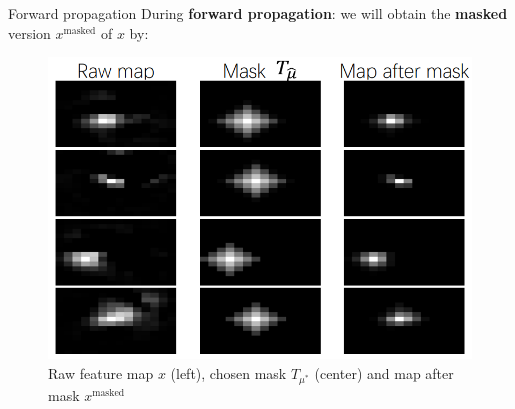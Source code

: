 \documentclass{beamer}
\begin{document}
\begin{frame}{Forward propagation}
	During \textbf{forward propagation}: we will obtain the \textbf{masked} version $x^{\mathrm{masked}}$ of $x$ by:
    \begin{figure}
        \centering
        \includegraphics[width=0.65\linewidth]{figures/masks.png}
        \caption{Raw feature map $x$ (left), chosen mask $T_{\mu^{*}}$ (center) and map after mask $x^{\mathrm{masked}}$}
        \label{fig:chosen_mask}
    \end{figure}
\end{frame}



\end{document}
